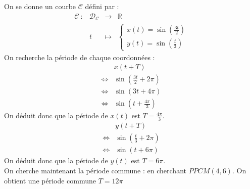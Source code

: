 \begin{ex}
On se donne un courbe $\mathscr{C}$ défini par  :
$$\begin{array}{cccc}
    \mathscr{C} \ : & \mathscr{D}_{\mathscr{C}} & \to & \mathbb{R} \\
         & t & \mapsto & \begin{cases}x(t)=\sin(\frac{3t}{2})\\y(t)=\sin(\frac{t}{3})\end{cases}
\end{array}$$
On recherche la période de chaque coordonnées :
\begin{align*}
    & x(t+T)\\
    \Leftrightarrow & \sin\left(\frac{3t}{2}+2\pi\right) \\
    \Leftrightarrow & \sin\left(3t+4\pi\right)\\
    \Leftrightarrow & \sin\left(t+\frac{4\pi}{3}\right)
\end{align*}
On déduit donc que la période de $x(t)$ est $T=\frac{4\pi}{3}$.
\begin{align*}
    & y(t+T)\\
    \Leftrightarrow & \sin\left(\frac{t}{3}+2\pi\right) \\
    \Leftrightarrow & \sin\left(t+6\pi\right)
\end{align*}
On déduit donc que la période de $y(t)$ est $T=6\pi$.\\
On cherche maintenant la période commune : en cherchant $PPCM(4,6)$.
On obtient une période commune $T=12\pi$
\end{ex}
